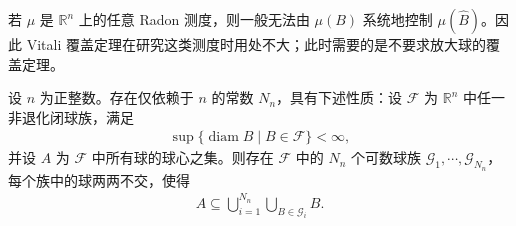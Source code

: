 \documentclass[../../main.tex]{subfiles}%
\begin{document}
若 $\mu$ 是 $\mathbb{R}^n$ 上的任意 Radon 测度，则一般无法由 $\mu(B)$ 系统地控制 $\mu(\hat B)$。因此 Vitali 覆盖定理在研究这类测度时用处不大；此时需要的是不要求放大球的覆盖定理。

\begin{theorem}\label{theorem:ch01-1-27}
设 $n$ 为正整数。存在仅依赖于 $n$ 的常数 $N_n$，具有下述性质：设 $\mathcal{F}$ 为 $\mathbb{R}^n$ 中任一非退化闭球族，满足
\begin{align*}
\sup\{\operatorname{diam}B\mid B\in\mathcal{F}\}<\infty ,
\end{align*}
并设 $A$ 为 $\mathcal{F}$ 中所有球的球心之集。则存在 $\mathcal{F}$ 中的 $N_n$ 个可数球族 $\mathcal{G}_1,\cdots,\mathcal{G}_{N_n}$，每个族中的球两两不交，使得
\begin{align*}
A\subseteq\bigcup_{i=1}^{N_n}\bigcup_{B\in\mathcal{G}_i}B .
\end{align*}
\end{theorem}
\end{document}
